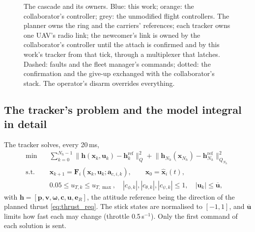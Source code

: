 \begin{figure}[htbp]
\caption[The cascade and its owners]{The cascade and its owners. Blue: this work; orange: the collaborator's
controller; grey: the unmodified flight controllers. The planner owns the ring and the carriers' references; each
tracker owns one UAV's radio link; the newcomer's link is owned by the collaborator's controller until the attach
is confirmed and by this work's tracker from that tick, through a multiplexer that latches. Dashed: faults and the
fleet manager's commands; dotted: the confirmation and the give-up exchanged with the collaborator's stack. The
operator's disarm overrides everything.}
\label{fig:owners}
\end{figure}

\subsection{The tracker's problem and the model integral in detail}
\label{sec:app_integral}

The tracker solves, every 20\,ms,
\begin{equation}
\begin{aligned}
    \min \quad & \sum_{k=0}^{N_h-1} \big\| \mathbf{h}(\mathbf{x}_k, \mathbf{u}_k) - \mathbf{h}_k^{\mathrm{ref}} \big\|_{Q}^{2} + \big\| \mathbf{h}_{N_h}(\mathbf{x}_{N_h}) - \mathbf{h}_{N_h}^{\mathrm{ref}} \big\|_{Q_{N_h}}^{2} \\
    \text{s.t.} \quad & \mathbf{x}_{k+1} = \mathbf{F}_i(\mathbf{x}_k, \mathbf{u}_k; \mathbf{a}_{c,i,k}), \qquad \mathbf{x}_0 = \hat{\mathbf{x}}_i(t), \\
    & 0.05 \le u_{T,k} \le u_{T,\max}, \quad |c_{\phi,k}|, |c_{\theta,k}|, |c_{\psi,k}| \le 1, \quad |\mathbf{u}_k| \le \overline{\mathbf{u}},
\end{aligned}
\label{eq:trk_ocp}
\end{equation}
with $\mathbf{h} = [\mathbf{p}, \mathbf{v}, \boldsymbol{\omega}, \mathbf{c}, \mathbf{u}, \mathbf{e}_R]$, the
attitude reference being the direction of the planned thrust \eqref{eq:thrust_req}. The stick states
are normalised to $[-1, 1]$, and $\overline{\mathbf{u}}$ limits how fast each may change (throttle
0.5\,s$^{-1}$). Only the first command of each solution is sent.




